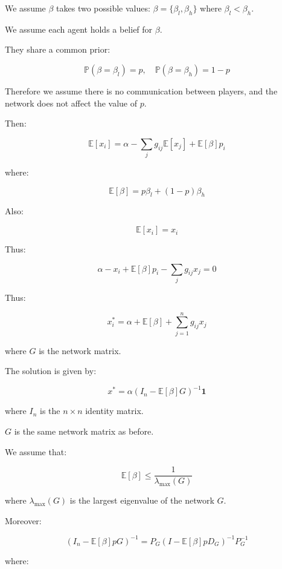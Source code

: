 \documentclass[12pt]{article}
\begin{document}
We assume $\beta$ takes two possible values: $\beta = \{\beta_l,\beta_h\}$ where $\beta_l < \beta_h$. 

We assume each agent holds a belief for $\beta$.

They share a common prior:

\[
\mathbb{P}(\beta = \beta_l) = p, \quad \mathbb{P}(\beta = \beta_h) = 1-p
\]

Therefore we assume there is no communication between players, and the network does not affect the value of $p$.

Then:

\[
\mathbb{E}[x_i] = \alpha - \sum_{j} g_{ij} \mathbb{E}[x_j] + \mathbb{E}[\beta] p_i
\]

where:

\[
\mathbb{E}[\beta] = p \beta_l + (1-p) \beta_h
\]

Also:

\[
\mathbb{E}[x_i] = x_i
\]

Thus:

\[
\alpha - x_i + \mathbb{E}[\beta] p_i - \sum_{j} g_{ij} x_j = 0
\]

\vspace{1em}

Thus:

\[
x_i^* = \alpha + \mathbb{E}[\beta] + \sum_{j=1}^{n} g_{ij} x_j
\]

where $G$ is the network matrix.

\vspace{1em}

The solution is given by:

\[
x^* = \alpha (I_n - \mathbb{E}[\beta] G)^{-1} \mathbf{1}
\]

where $I_n$ is the $n \times n$ identity matrix.

$G$ is the same network matrix as before.

\vspace{1em}

We assume that:

\[
\mathbb{E}[\beta] \leq \frac{1}{\lambda_{\text{max}}(G)}
\]

where $\lambda_{\text{max}}(G)$ is the largest eigenvalue of the network $G$.

\vspace{1em}

Moreover:

\[
(I_n - \mathbb{E}[\beta] p G)^{-1} = P_G \left( I - \mathbb{E}[\beta] p D_G \right)^{-1} P_G^{-1}
\]

where:
\end{document}
